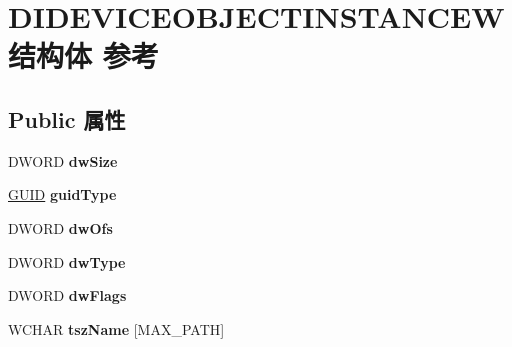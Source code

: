 \hypertarget{struct_d_i_d_e_v_i_c_e_o_b_j_e_c_t_i_n_s_t_a_n_c_e_w}{}\section{D\+I\+D\+E\+V\+I\+C\+E\+O\+B\+J\+E\+C\+T\+I\+N\+S\+T\+A\+N\+C\+E\+W结构体 参考}
\label{struct_d_i_d_e_v_i_c_e_o_b_j_e_c_t_i_n_s_t_a_n_c_e_w}
\subsection*{Public 属性}
\begin{DoxyCompactItemize}
\item 
\mbox{\label{struct_d_i_d_e_v_i_c_e_o_b_j_e_c_t_i_n_s_t_a_n_c_e_w_a2fbed541278941e86c3fbf11dfd297c3}} 
D\+W\+O\+RD {\bfseries dw\+Size}
\item 
\mbox{\label{struct_d_i_d_e_v_i_c_e_o_b_j_e_c_t_i_n_s_t_a_n_c_e_w_a4c152079b03b9562a5b47a646733b6df}} 
\hyperlink{interface_g_u_i_d}{G\+U\+ID} {\bfseries guid\+Type}
\item 
\mbox{\label{struct_d_i_d_e_v_i_c_e_o_b_j_e_c_t_i_n_s_t_a_n_c_e_w_a2b28e87efeab1ed1f566beac50e79ed9}} 
D\+W\+O\+RD {\bfseries dw\+Ofs}
\item 
\mbox{\label{struct_d_i_d_e_v_i_c_e_o_b_j_e_c_t_i_n_s_t_a_n_c_e_w_ad9c4bdb5203844e414f92775912f304d}} 
D\+W\+O\+RD {\bfseries dw\+Type}
\item 
\mbox{\label{struct_d_i_d_e_v_i_c_e_o_b_j_e_c_t_i_n_s_t_a_n_c_e_w_a42adc48f109981061c6f876b847d15f7}} 
D\+W\+O\+RD {\bfseries dw\+Flags}
\item 
\mbox{\label{struct_d_i_d_e_v_i_c_e_o_b_j_e_c_t_i_n_s_t_a_n_c_e_w_a845aa8a8663e0891936d076c086d9b03}} 
W\+C\+H\+AR {\bfseries tsz\+Name} \mbox{[}M\+A\+X\+\_\+\+P\+A\+TH\mbox{]}
\item 
\mbox{\label{struct_d_i_d_e_v_i_c_e_o_b_j_e_c_t_i_n_s_t_a_n_c_e_w_a0e709965bc21164382c75e261816ab9e}} 

\end{DoxyCompactItemize}

